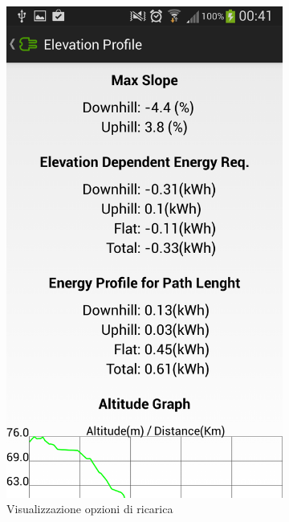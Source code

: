 \begin{figure}
\begin{subfigure}{0.45\textwidth}
		\includegraphics[width=\textwidth]{assets/mobile-app-altimetry-2.png}
		\caption{Visualizzazione opzioni di ricarica}
		\label{fig:altimetry-2}
    \end{subfigure}
	\begin{subfigure}{0.45\textwidth}

\end{subfigure}
\end{figure}
